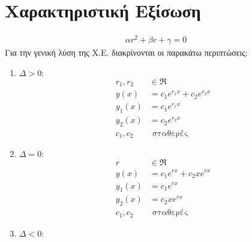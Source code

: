 \documentclass[12pt]{extarticle}
\begin{document}
\section{Χαρακτηριστική Eξίσωση}
\begin{equation*}
    \begin{aligned}
        \alpha r^2 + \beta r + \gamma = 0
    \end{aligned}
\end{equation*}
Για την γενική λύση της Χ.Ε. διακρίνονται οι παρακάτω περιπτώσεις:
\begin{enumerate}
    \item \begin{math}
              \Delta   > 0 :
          \end{math}
          \begin{equation*}
              \begin{aligned}
                  r_1, r_2 & \in \Re                       \\
                  y(x)     & = c_1 e^{r_1x} + c_2 e^{r_2x} \\
                  y_1(x)   & = c_1 e^{r_1x}                \\
                  y_2(x)   & = c_2 e^{r_2x}                \\
                  c_1, c_2 & \text{ σταθερές}
              \end{aligned}
          \end{equation*}
    \item \begin{math}
              \Delta   = 0 :
          \end{math}
          \begin{equation*}
              \begin{aligned}
                  r        & \in \Re                     \\
                  y(x)     & = c_1 e^{rx} + c_2 x e^{rx} \\
                  y_1(x)   & = c_1 e^{rx}                \\
                  y_2(x)   & = c_2 x e^{rx}              \\
                  c_1, c_2 & \text{ σταθερές}
              \end{aligned}
          \end{equation*}
    \item \begin{math}
              \Delta   < 0 :
          \end{math}

\end{enumerate}
\end{document}
